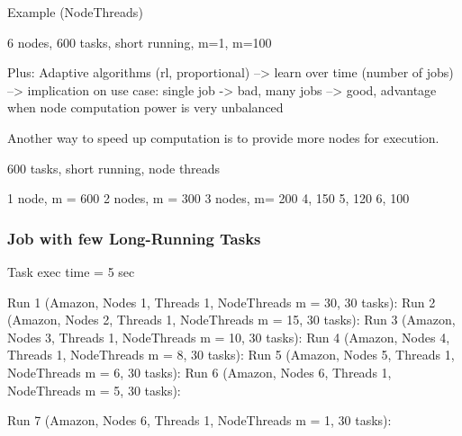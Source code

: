 \documentclass[12pt]{article}
\begin{document}
Example (NodeThreads)

6 nodes, 600 tasks, short running, m=1, m=100

Plus: Adaptive algorithms (rl, proportional) --> learn over time (number of jobs) --> implication on use case: single job -> bad, many jobs --> good, advantage when node computation power is very unbalanced

Another way to speed up computation is to provide more nodes for execution.

600 tasks, short running, node threads

1 node, m = 600
2 nodes, m = 300
3 nodes, m= 200
4, 150
5, 120
6, 100

\subsubsection{Job with few Long-Running Tasks}

Task exec time = 5 sec

Run 1 (Amazon, Nodes 1, Threads 1, NodeThreads m = 30, 30 tasks): 
Run 2 (Amazon, Nodes 2, Threads 1, NodeThreads m = 15, 30 tasks): 
Run 3 (Amazon, Nodes 3, Threads 1, NodeThreads m = 10, 30 tasks): 
Run 4 (Amazon, Nodes 4, Threads 1, NodeThreads m = 8, 30 tasks): 
Run 5 (Amazon, Nodes 5, Threads 1, NodeThreads m = 6, 30 tasks): 
Run 6 (Amazon, Nodes 6, Threads 1, NodeThreads m = 5, 30 tasks): 

Run 7 (Amazon, Nodes 6, Threads 1, NodeThreads m = 1, 30 tasks): 

\newpage

\appendix


\end{document}
